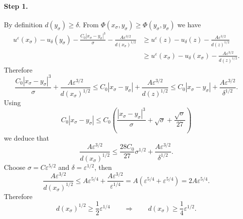 \documentclass[11pt,reqno]{amsart}
\numberwithin{figure}{section}
\theoremstyle{plain}
\theoremstyle{remark}
\numberwithin{equation}{section}
\begin{document}
\paragraph{Step 1.} By definition $d(y_\sigma)\geq \delta$. From $\Phi(x_\sigma,y_\sigma)\geq \Phi(y_\sigma,y_\sigma)$ we have
\begin{align*}
    u^\varepsilon(x_\sigma) - u_\delta(y_\sigma) - \frac{C_0|x_\sigma - y_\sigma|^3}{\sigma} - \frac{A\varepsilon^{3/2}}{d(x_\sigma)^{1/2}} &\geq u^\varepsilon(z) - u_\delta(z) - \frac{A\varepsilon^{3/2}}{d(z)^{1/2}}\\
    &\geq u^\varepsilon(x_\sigma) - u_\delta(x_\sigma) - \frac{A\varepsilon^{3/2}}{d(z)^{1/2}}.
\end{align*}
Therefore
\begin{equation*}
    \frac{C_0|x_\sigma - y_\sigma|^3}{\sigma} + \frac{A\varepsilon^{3/2}}{d(x_\sigma)^{1/2}} \leq C_0|x_\sigma - y_\sigma|+\frac{A\varepsilon^{3/2}}{d(z)^{1/2}} \leq C_0|x_\sigma - y_\sigma|+\frac{A\varepsilon^{3/2}}{\delta^{1/2}} .
\end{equation*}
Using
\begin{equation*}
    C_0|x_\sigma-y_\sigma| \leq C_0\left(\frac{|x_\sigma - y_\sigma|^3}{\sigma}+\sqrt{\sigma}+\frac{\sqrt{\sigma}}{27}\right) 
\end{equation*}
we deduce that
\begin{equation}\label{sleep}
    \frac{A\varepsilon^{3/2}}{d(x_\sigma)^{1/2}} \leq \frac{28C_0}{27}\sigma^{1/2}+ \frac{A\varepsilon^{3/2}}{\delta^{1/2}}.
\end{equation}
Choose $\sigma = C\varepsilon^{5/2}$ and $\delta = \varepsilon^{1/2}$, then
\begin{equation*}
     \frac{A\varepsilon^{3/2}}{d(x_\sigma)^{1/2}} \leq A\varepsilon^{5/4} + \frac{A\varepsilon^{3/2}}{\varepsilon^{1/4}} = A(\varepsilon^{5/4} +\varepsilon^{5/4}) = 2A\varepsilon^{5/4}.
\end{equation*}
Therefore
\begin{equation*}
    d(x_\sigma)^{1/2} \geq \frac{1}{2}\varepsilon^{1/4} \qquad\Longrightarrow\qquad d(x_\sigma) \geq \frac{1}{4}\varepsilon^{1/2}.
\end{equation*}
\end{document}

